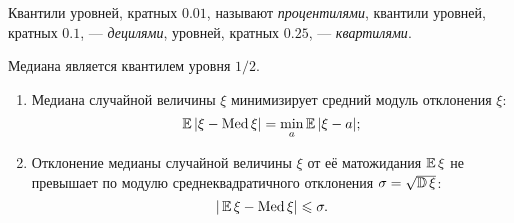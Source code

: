\begin{defn}
    Квантили уровней, кратных $0.01$, называют \textit{процентилями}, квантили уровней, кратных $0.1$, — \textit{децилями}, уровней, кратных $0.25$, — \textit{квартилями}.
\end{defn} 

\begin{rmrk}
    Медиана является квантилем уровня $1 / 2$.
\end{rmrk} 

\begin{namedthm}\leavevmode
\begin{enumerate}
    \item Медиана случайной величины $\xi$ минимизирует средний модуль отклонения $\xi$:
    \begin{equation*}
        \operatorname{\mathbb{E}} |\xi - \operatorname{Med} \xi| 
    = \min _{a} \operatorname{\mathbb{E}} |\xi-a|;
    \end{equation*}
    \item Отклонение медианы случайной величины $\xi$ от её матожидания $\operatorname{\mathbb{E}} \xi$ не превышает по модулю среднеквадратичного отклонения $\sigma = \sqrt{\operatorname{\mathbb{D}}\xi}$:
    \begin{equation*}
        |\operatorname{\mathbb{E}} \xi - \operatorname{Med}\xi| \leqslant \sigma.
    \end{equation*}
\end{enumerate}
\end{namedthm}

